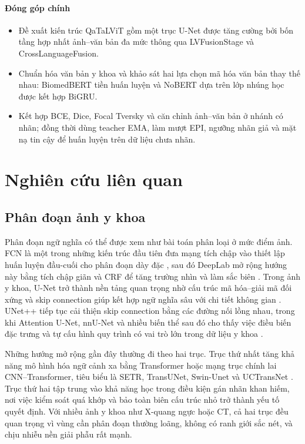 \paragraph{Đóng góp chính}
\begin{itemize}
  \item Đề xuất kiến trúc QaTaLViT gồm một trục U-Net được tăng cường bởi bốn tầng hợp nhất ảnh--văn bản đa mức thông qua LVFusionStage và CrossLanguageFusion.
  \item Chuẩn hóa văn bản y khoa và khảo sát hai lựa chọn mã hóa văn bản thay thế nhau: BiomedBERT tiền huấn luyện và NoBERT dựa trên lớp nhúng học được kết hợp BiGRU.
  \item Kết hợp BCE, Dice, Focal Tversky và căn chỉnh ảnh--văn bản ở nhánh có nhãn; đồng thời dùng teacher EMA, làm mượt EPI, ngưỡng nhãn giả và mặt nạ tin cậy để huấn luyện trên dữ liệu chưa nhãn.
\end{itemize}

\section{Nghiên cứu liên quan}
\label{sec:related}

\subsection{Phân đoạn ảnh y khoa}

Phân đoạn ngữ nghĩa có thể được xem như bài toán phân loại ở mức điểm ảnh. FCN là một trong những kiến trúc đầu tiên đưa mạng tích chập vào thiết lập huấn luyện đầu-cuối cho phân đoạn dày đặc \cite{long2015fcn}, sau đó DeepLab mở rộng hướng này bằng tích chập giãn và CRF để tăng trường nhìn và làm sắc biên \cite{chen2018deeplab}. Trong ảnh y khoa, U-Net trở thành nền tảng quan trọng nhờ cấu trúc mã hóa--giải mã đối xứng và skip connection giúp kết hợp ngữ nghĩa sâu với chi tiết không gian \cite{ronneberger2015unet}. UNet++ tiếp tục cải thiện skip connection bằng các đường nối lồng nhau, trong khi Attention U-Net, nnU-Net và nhiều biến thể sau đó cho thấy việc điều biến đặc trưng và tự cấu hình quy trình có vai trò lớn trong dữ liệu y khoa \cite{zhou2018unetpp,oktay2018attention,isensee2021nnunet}.

Những hướng mở rộng gần đây thường đi theo hai trục. Trục thứ nhất tăng khả năng mô hình hóa ngữ cảnh xa bằng Transformer hoặc mạng trục chính lai CNN--Transformer, tiêu biểu là SETR, TransUNet, Swin-Unet và UCTransNet \cite{zheng2021setr,chen2021transunet,cao2021swinunet,wang2021uctransnet}. Trục thứ hai tập trung vào khả năng học trong điều kiện gán nhãn khan hiếm, nơi việc kiểm soát quá khớp và bảo toàn biên cấu trúc nhỏ trở thành yếu tố quyết định. Với nhiều ảnh y khoa như X-quang ngực hoặc CT, cả hai trục đều quan trọng vì vùng cần phân đoạn thường loãng, không có ranh giới sắc nét, và chịu nhiễu nền giải phẫu rất mạnh.

